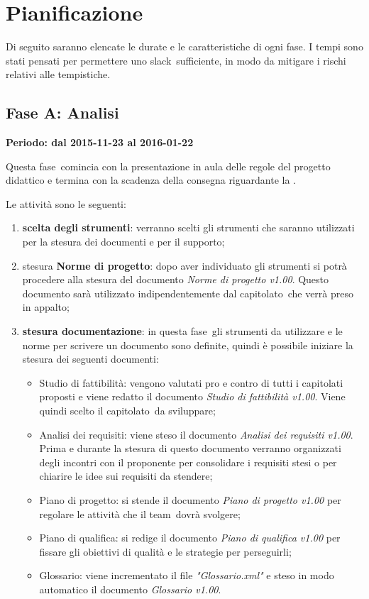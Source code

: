 \documentclass[../PianoProgetto.tex]{subfiles}
\begin{document}
\section{Pianificazione}
\label{sec:pianificazione}

	Di seguito saranno elencate le durate e le caratteristiche di ogni fase\g . I tempi sono stati pensati per permettere uno slack\g\ sufficiente, in modo da mitigare i rischi relativi alle tempistiche.
	
	\subsection{Fase A: Analisi}
	
	\textbf{Periodo: dal 2015-11-23 al 2016-01-22}

	Questa fase\g\ comincia con la presentazione in aula delle regole del progetto didattico e termina con la scadenza della consegna riguardante la \revisionedeirequisiti .

	Le attività sono le seguenti:
	\begin{enumerate}
		\item \textbf{scelta degli strumenti}: verranno scelti gli strumenti che saranno utilizzati per la stesura dei documenti e per il supporto;
		\item stesura \textbf{Norme di progetto}: dopo aver individuato gli strumenti si potrà procedere alla stesura del documento \textit{Norme di progetto v1.00}. Questo documento sarà utilizzato indipendentemente dal capitolato\g\ che verrà preso in appalto;
		\item \textbf{stesura documentazione}: in questa fase\g{}li strumenti da utilizzare e le norme per scrivere un documento sono definite, quindi è possibile iniziare la stesura dei seguenti documenti:
		\begin{itemize}
		\item Studio di fattibilità: vengono valutati pro e contro di tutti i capitolati proposti e viene redatto il documento \textit{Studio di fattibilità v1.00}. Viene quindi scelto il capitolato\g\ da sviluppare;
		\item Analisi dei requisiti: viene steso il documento \textit{Analisi dei requisiti v1.00}. Prima e durante la stesura di questo documento verranno organizzati degli incontri con il proponente per consolidare i requisiti stesi o per chiarire le idee sui requisiti da stendere;
		\item Piano di progetto: si stende il documento \textit{Piano di progetto v1.00} per regolare le attività che il team\g\ dovrà svolgere;
		\item Piano di qualifica: si redige il documento \textit{Piano di qualifica v1.00} per fissare gli obiettivi di qualità e le strategie per perseguirli;
		\item Glossario: viene incrementato il file \textit{"Glossario.xml"} e steso in modo automatico il documento \textit{Glossario v1.00}.
		\end{itemize}
	\end{enumerate}
		\newpage
\end{document}
